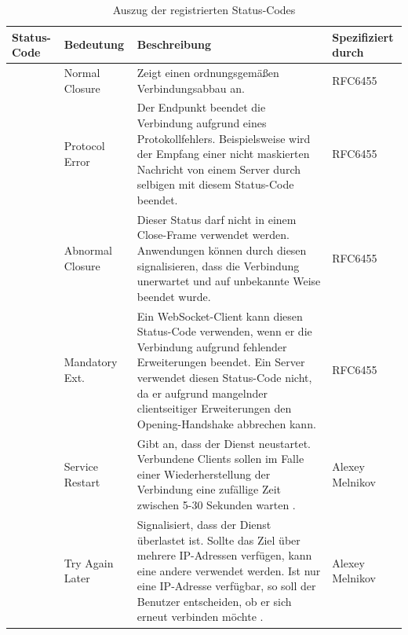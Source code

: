 \documentclass[11pt,a4paper,titlepage]{scrartcl}
\numberwithin{equation}{section}
\begin{document}
\begin{table}[ht]
	\begin{center}
		\begin{tabular}{|>{\centering\arraybackslash}p{1.2cm}|l|>{\arraybackslash}p{8.0cm}|l|}
			\hline
			Status-Code & Bedeutung &  Beschreibung & Spezifiziert durch \\ \hline
			1000 & Normal Closure & Zeigt einen ordnungsgemäßen Verbindungsabbau an. & RFC6455  \\ \hline
			1002 & Protocol Error &  Der Endpunkt beendet die Verbindung aufgrund eines Protokollfehlers. Beispielsweise wird der Empfang einer nicht maskierten Nachricht von einem Server durch selbigen mit diesem Status-Code beendet. & RFC6455 \\ \hline
			1006 & Abnormal Closure &  Dieser Status darf nicht in einem Close-Frame verwendet werden. Anwendungen können durch diesen signalisieren, dass die Verbindung unerwartet und auf unbekannte Weise beendet wurde.  & RFC6455 \\ \hline
			1010 & Mandatory Ext. & Ein WebSocket-Client kann diesen Status-Code verwenden, wenn er die Verbindung aufgrund fehlender Erweiterungen beendet. Ein Server verwendet diesen Status-Code nicht, da er aufgrund mangelnder clientseitiger Erweiterungen den Opening-Handshake abbrechen kann. & RFC6455 \\ \hline
			1012 & Service Restart & Gibt an, dass der Dienst neustartet. Verbundene Clients sollen im Falle einer Wiederherstellung der Verbindung eine zufällige Zeit zwischen 5-30 Sekunden warten \autocite{melnikov_additional_2012}. & Alexey Melnikov \\ \hline
			1013 & Try Again Later & Signalisiert, dass der Dienst überlastet ist. Sollte das Ziel über mehrere IP-Adressen verfügen, kann eine andere verwendet werden. Ist nur eine IP-Adresse verfügbar, so soll der Benutzer entscheiden, ob er sich erneut verbinden möchte \autocite{melnikov_additional_2012}. & Alexey Melnikov \\ \hline
		\end{tabular}
		\caption{Auszug der registrierten Status-Codes}\label{tbl:wsCloseCodes}
	\end{center}
\end{table}
\end{document}
